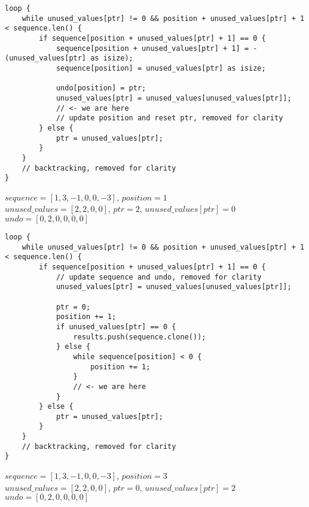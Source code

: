 \begin{frame}[fragile]
    \begin{verbatim}
loop {
    while unused_values[ptr] != 0 && position + unused_values[ptr] + 1 < sequence.len() {
        if sequence[position + unused_values[ptr] + 1] == 0 {
            sequence[position + unused_values[ptr] + 1] = -(unused_values[ptr] as isize);
            sequence[position] = unused_values[ptr] as isize;
            
            undo[position] = ptr;
            unused_values[ptr] = unused_values[unused_values[ptr]];
            // <- we are here
            // update position and reset ptr, removed for clarity
        } else {
            ptr = unused_values[ptr];
        }
    }
    // backtracking, removed for clarity
}
    \end{verbatim}
    $sequence = [1, 3, -1, 0, 0, -3]$, $position = 1$\\
    $unused\_values = [2, 2, 0, 0]$, $ptr = 2$, $unused\_values[ptr] = 0$\\
    $undo = [0, 2, 0, 0, 0, 0]$
\end{frame}
\begin{frame}[fragile]
    \begin{verbatim}
loop {
    while unused_values[ptr] != 0 && position + unused_values[ptr] + 1 < sequence.len() {
        if sequence[position + unused_values[ptr] + 1] == 0 {
            // update sequence and undo, removed for clarity
            unused_values[ptr] = unused_values[unused_values[ptr]];
            
            ptr = 0;
            position += 1;
            if unused_values[ptr] == 0 {
                results.push(sequence.clone());
            } else {
                while sequence[position] < 0 {
                    position += 1;
                }
                // <- we are here
            }
        } else {
            ptr = unused_values[ptr];
        }
    }
    // backtracking, removed for clarity
}
    \end{verbatim}
    $sequence = [1, 3, -1, 0, 0, -3]$, $position = 3$\\
    $unused\_values = [2, 2, 0, 0]$, $ptr = 0$, $unused\_values[ptr] = 2$\\
    $undo = [0, 2, 0, 0, 0, 0]$
\end{frame}
